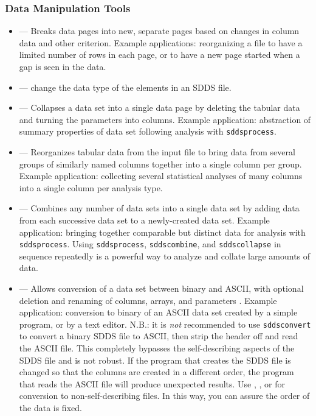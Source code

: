 \documentclass[11pt]{article}
\begin{document}
\subsubsection{ Data Manipulation Tools}
\begin{itemize}

\item {} --- Breaks data pages into new, separate pages based on changes in column data and other
criterion.  Example applications: reorganizing a file to have a limited number of rows in each page, or to have a
new page started when a gap is seen in the data.

\item {} --- change the data type of the elements in an SDDS file.

\item {} --- Collapses a data set into a single data page by deleting the tabular data and
turning the parameters into columns.  Example application: abstraction of summary properties of data set following
analysis with \verb|sddsprocess|.

\item {} --- Reorganizes tabular data from the
input file to bring data from several groups of similarly named
columns together into a single column per group.  Example application:
collecting several statistical analyses of many columns into a single
column per analysis type.

\item {} --- Combines any number of data sets into a single data set by adding data from each
successive data set to a newly-created data set.  Example application: bringing together comparable but distinct
data for analysis with \verb|sddsprocess|.  Using \verb|sddsprocess|, \verb|sddscombine|, and \verb|sddscollapse|
in sequence repeatedly is a powerful way to analyze and collate large amounts of data.

\item {} --- Allows conversion of a data set between binary and ASCII, with optional deletion
and renaming of columns, arrays, and parameters .  Example application: conversion to binary of an ASCII data set
created by a simple program, or by a text editor.  N.B.: it is {\em not} recommended to use \verb|sddsconvert| to
convert a binary SDDS file to ASCII, then strip the header off and read the ASCII file.  This completely
bypasses the self-describing aspects of the SDDS file and is not robust.  If the program that creates the SDDS
file is changed so that the columns are created in a different order, the program that reads the ASCII file
will produce unexpected results. Use , , or 
for conversion to non-self-describing files.  In this way, you can assure the order of the data is fixed.


\end{itemize}
\end{document}
